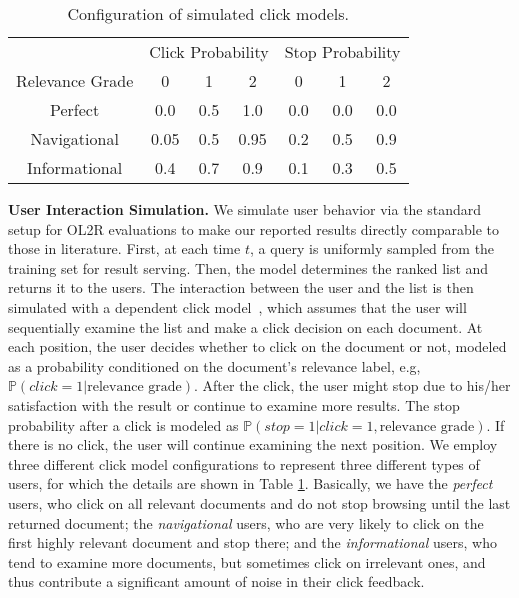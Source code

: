 \begin{table}
  \caption{Configuration of simulated click models.}
  \vspace{-2mm}
  \label{table:click}
  \centering
  \begin{tabular}{cccc|ccc}
    \hline
                & \multicolumn{3}{c}{Click Probability} & \multicolumn{3}{c}{Stop Probability} \\
Relevance Grade & 0           & 1          & 2          & 0          & 1          & 2          \\ \hline
Perfect         & 0.0         & 0.5        & 1.0        & 0.0        & 0.0        & 0.0        \\
Navigational    & 0.05        & 0.5        & 0.95       & 0.2        & 0.5        & 0.9        \\
Informational   & 0.4         & 0.7        & 0.9        & 0.1        & 0.3        & 0.5        \\ \hline
\end{tabular}
\vspace{-5mm}
\end{table}

\noindent\textbf{User Interaction Simulation.} We simulate user behavior via the standard setup for OL2R evaluations \cite{oosterhuis2018differentiable, wang2019variance} to make our reported results directly comparable to those in literature. First, at each time $t$, a query is uniformly sampled from the training set for result serving. Then, the model determines the ranked list and returns it to the users. The interaction between the user and the list is then simulated with a dependent click model~\cite{guo2009efficient}, which assumes that the user will sequentially examine the list and make a click decision on each document. At each position, the user decides whether to click on the document or not, modeled as a probability conditioned on the document's relevance label, e.g, $\mathbb{P}(click = 1 | \text{relevance grade})$. After the click, the user might stop due to his/her satisfaction with the result or continue to examine more results. The stop probability after a click is modeled as $\mathbb{P}(stop = 1 |click = 1, \text{relevance grade})$. If there is no click, the user will continue examining the next position. We employ three different click model configurations to represent three different types of users, for which the details are shown in Table \ref{table:click}. Basically, we have the \textit{perfect} users, who click on all relevant documents and do not stop browsing until the last returned document; the \textit{navigational} users, who are very likely to click on the first highly relevant document and stop there; and the \textit{informational} users, who tend to examine more documents, but sometimes click on irrelevant ones, and thus contribute a significant amount of noise in their click feedback.




